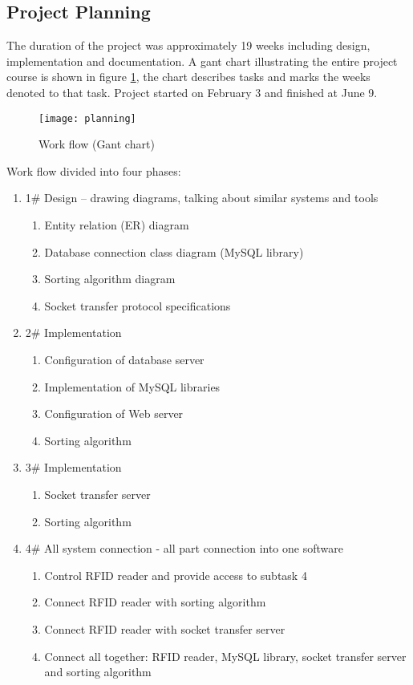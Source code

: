 \subsection{Project Planning}

The duration of the project was approximately 19 weeks including design, implementation and documentation. A gant chart illustrating the entire project course is shown in figure \ref{fig:planning}, the chart describes tasks and marks the weeks denoted to that task. Project started on February 3 and finished at June 9.

\begin{figure}[h]
	\centering
		\texttt{[image: planning]}
	\caption{Work flow (Gant chart)}
	\label{fig:planning}
\end{figure}

\newpage
Work flow divided into four phases:

\begin{enumerate}
  \item 1\# Design – drawing diagrams, talking about similar systems and tools
  \begin{enumerate}
    \item Entity relation (ER) diagram
    \item Database connection class diagram (MySQL library)
    \item Sorting algorithm diagram
    \item Socket transfer protocol specifications
  \end{enumerate}
  \item 2\# Implementation
  \begin{enumerate}
    \item Configuration of database server
    \item Implementation of MySQL libraries
    \item Configuration of Web server
    \item Sorting algorithm
  \end{enumerate} 
  \item 3\# Implementation
  \begin{enumerate}
    \item Socket transfer server
    \item Sorting algorithm
  \end{enumerate}
  \item 4\# All system connection - all part connection into one software
  \begin{enumerate}
    \item Control RFID reader and provide access to subtask 4
    \item Connect RFID reader with sorting algorithm
    \item Connect RFID reader with socket transfer server
    \item Connect all together: RFID reader, MySQL library, socket transfer server and sorting algorithm
  \end{enumerate} 
\end{enumerate}

